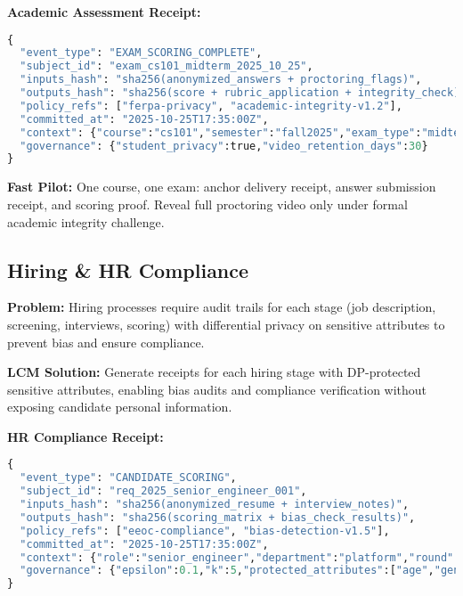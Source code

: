 \documentclass[12pt,a4paper]{article}
\begin{document}
\begin{technicalbox}
\textbf{Academic Assessment Receipt:}
\begin{lstlisting}[language=Python, caption=Academic Proctoring Receipt]
{
  "event_type": "EXAM_SCORING_COMPLETE",
  "subject_id": "exam_cs101_midterm_2025_10_25",
  "inputs_hash": "sha256(anonymized_answers + proctoring_flags)",
  "outputs_hash": "sha256(score + rubric_application + integrity_check)",
  "policy_refs": ["ferpa-privacy", "academic-integrity-v1.2"],
  "committed_at": "2025-10-25T17:35:00Z",
  "context": {"course":"cs101","semester":"fall2025","exam_type":"midterm"},
  "governance": {"student_privacy":true,"video_retention_days":30}
}
\end{lstlisting}
\end{technicalbox}

\textbf{Fast Pilot:} One course, one exam: anchor delivery receipt, answer submission receipt, and scoring proof. Reveal full proctoring video only under formal academic integrity challenge.

\subsection{Hiring \& HR Compliance}

\textbf{Problem:} Hiring processes require audit trails for each stage (job description, screening, interviews, scoring) with differential privacy on sensitive attributes to prevent bias and ensure compliance.

\textbf{LCM Solution:} Generate receipts for each hiring stage with DP-protected sensitive attributes, enabling bias audits and compliance verification without exposing candidate personal information.

\begin{technicalbox}
\textbf{HR Compliance Receipt:}
\begin{lstlisting}[language=Python, caption=Hiring Process Receipt]
{
  "event_type": "CANDIDATE_SCORING",
  "subject_id": "req_2025_senior_engineer_001",
  "inputs_hash": "sha256(anonymized_resume + interview_notes)",
  "outputs_hash": "sha256(scoring_matrix + bias_check_results)",
  "policy_refs": ["eeoc-compliance", "bias-detection-v1.5"],
  "committed_at": "2025-10-25T17:35:00Z",
  "context": {"role":"senior_engineer","department":"platform","round":2},
  "governance": {"epsilon":0.1,"k":5,"protected_attributes":["age","gender"]}
}
\end{lstlisting}
\end{technicalbox}
\end{document}
